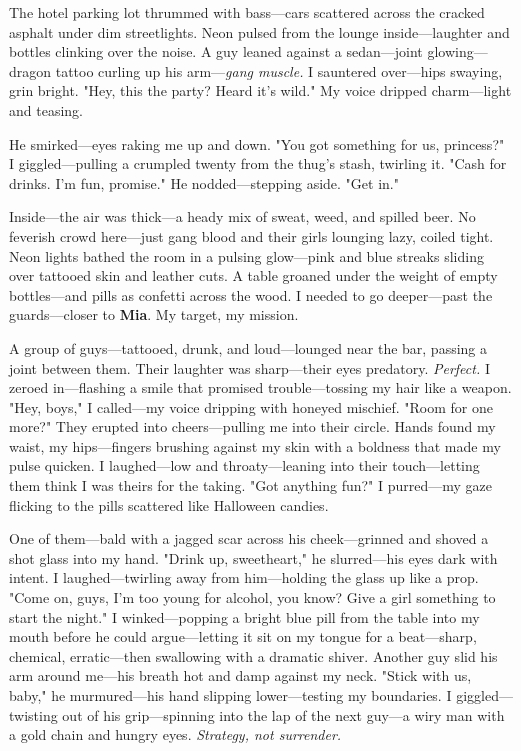 \documentclass{article}
\begin{document}
The hotel parking lot thrummed with bass—cars scattered across the cracked asphalt under dim streetlights. Neon pulsed from the lounge inside—laughter and bottles clinking over the noise. A guy leaned against a sedan—joint glowing—dragon tattoo curling up his arm—\textit{gang muscle.} I sauntered over—hips swaying, grin bright. "Hey, this the party? Heard it’s wild." My voice dripped charm—light and teasing.

He smirked—eyes raking me up and down. "You got something for us, princess?" I giggled—pulling a crumpled twenty from the thug’s stash, twirling it. "Cash for drinks. I’m fun, promise." He nodded—stepping aside. "Get in."

Inside—the air was thick—a heady mix of sweat, weed, and spilled beer. No feverish crowd here—just gang blood and their girls lounging lazy, coiled tight. Neon lights bathed the room in a pulsing glow—pink and blue streaks sliding over tattooed skin and leather cuts. A table groaned under the weight of empty bottles—and pills as confetti across the wood. I needed to go deeper—past the guards—closer to \textbf{Mia}. My target, my mission.

A group of guys—tattooed, drunk, and loud—lounged near the bar, passing a joint between them. Their laughter was sharp—their eyes predatory. \textit{Perfect.} I zeroed in—flashing a smile that promised trouble—tossing my hair like a weapon. "Hey, boys," I called—my voice dripping with honeyed mischief. "Room for one more?" They erupted into cheers—pulling me into their circle. Hands found my waist, my hips—fingers brushing against my skin with a boldness that made my pulse quicken. I laughed—low and throaty—leaning into their touch—letting them think I was theirs for the taking. "Got anything fun?" I purred—my gaze flicking to the pills scattered like Halloween candies.

One of them—bald with a jagged scar across his cheek—grinned and shoved a shot glass into my hand. "Drink up, sweetheart," he slurred—his eyes dark with intent. I laughed—twirling away from him—holding the glass up like a prop. "Come on, guys, I’m too young for alcohol, you know? Give a girl something to start the night." I winked—popping a bright blue pill from the table into my mouth before he could argue—letting it sit on my tongue for a beat—sharp, chemical, erratic—then swallowing with a dramatic shiver. Another guy slid his arm around me—his breath hot and damp against my neck. "Stick with us, baby," he murmured—his hand slipping lower—testing my boundaries. I giggled—twisting out of his grip—spinning into the lap of the next guy—a wiry man with a gold chain and hungry eyes. \textit{Strategy, not surrender.}
\end{document}
